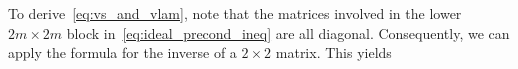 \begin{remark}

To derive~\eqref{eq:vs_and_vlam}, note that the matrices involved in the lower $2m\times 2m$ block in~\eqref{eq:ideal_precond_ineq} are all diagonal.  Consequently, we can apply the formula for the inverse of a $2\times 2$ matrix.  This yields


\end{remark}
